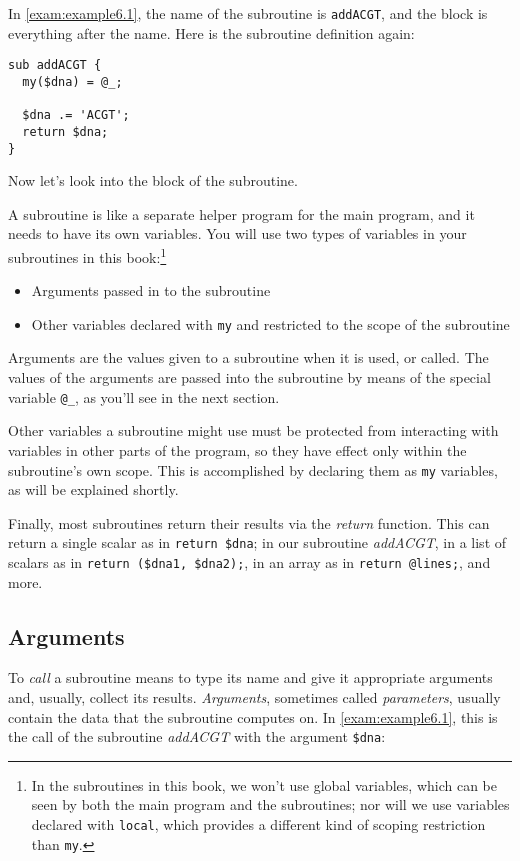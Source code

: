 In \autoref{exam:example6.1}, the name of the subroutine is \verb|addACGT|, and the block is everything after the name. Here is the subroutine definition again:

\begin{lstlisting}
sub addACGT {
  my($dna) = @_;

  $dna .= 'ACGT';
  return $dna;
}
\end{lstlisting}

Now let's look into the block of the subroutine.

A subroutine is like a separate helper program for the main program, and it needs to have its own variables. You will use two types of variables in your subroutines in this book:\footnote{In the subroutines in this book, we won't use global variables, which can be seen by both the main program and the subroutines; nor will we use variables declared with \verb|local|, which provides a different kind of scoping restriction than \verb|my|.}

\begin{itemize}
  \item Arguments passed in to the subroutine
  \item Other variables declared with \verb|my| and restricted to the scope of the subroutine
\end{itemize}

Arguments are the values given to a subroutine when it is used, or called. The values of the arguments are passed into the subroutine by means of the special variable \verb|@_|, as you'll see in the next section.

Other variables a subroutine might use must be protected from interacting with variables in other parts of the program, so they have effect only within the subroutine's own scope. This is accomplished by declaring them as \verb|my| variables, as will be explained shortly.

Finally, most subroutines return their results via the \textit{return} function.  This can return a single scalar as in \verb|return $dna|; in our subroutine \textit{addACGT}, in a list of scalars as in \verb|return ($dna1, $dna2);|, in an array as in \verb|return @lines;|, and more. 

\subsection{Arguments}
To \textit{call} a subroutine means to type its name and give it appropriate arguments and, usually, collect its results. \textit{Arguments}, sometimes called \textit{parameters}, usually contain the data that the subroutine computes on. In \autoref{exam:example6.1}, this is the call of the subroutine \textit{addACGT} with the argument \verb|$dna|:

